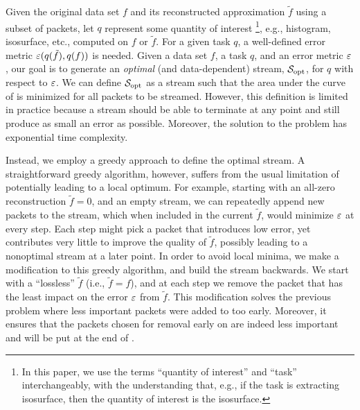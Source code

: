 Given the original data set $f$ and its reconstructed approximation $\tilde{f}$ using a subset of
packets, let $q$ represent some quantity of interest \footnote{In this paper, we use the terms
``quantity of interest'' and ``task'' interchangeably, with the understanding that, e.g., if the
task is extracting isosurface, then the quantity of interest is the isosurface.}, e.g., histogram,
isosurface, etc., computed on $f$ or $\tilde{f}$. For a given task $q$, a well-defined error metric
$\err(q(\tilde{f}),q(f))$ is needed. Given a data set $f$, a task $q$, and an error metric $\err$,
our goal is to generate an \emph{optimal} (and data-dependent) stream, $\sopt$, for $q$ with respect
to $\err$. We can define $\sopt$ as a stream such that the area under the curve of \err is minimized
for all packets to be streamed. However, this definition is limited in practice because a stream
should be able to terminate at any point and still produce as small an error as possible. Moreover,
the solution to the problem has exponential time complexity.

Instead, we employ a greedy approach to define the optimal stream.  A straightforward greedy
algorithm, however, suffers from the usual limitation of potentially leading to a local optimum. For
example, starting with an all-zero reconstruction $\tilde{f}=0$, and an empty stream, we can
repeatedly append new packets to the stream, which when included in the current $\tilde{f}$, would
minimize $\err$ at every step. Each step might pick a packet that introduces low error, yet
contributes very little to improve the quality of $\tilde{f}$, possibly leading to a nonoptimal
stream at a later point. In order to avoid local minima, we make a modification to this greedy
algorithm, and build the stream backwards. We start with a ``lossless'' $\tilde{f}$ (i.e.,
$\tilde{f}=f$), and at each step we remove the packet that has the least impact on the error $\err$
from $\tilde{f}$. This modification solves the previous problem where less important packets were
added to \sopt too early. Moreover, it ensures that the packets chosen for removal early on are
indeed less important and will be put at the end of \sopt.

